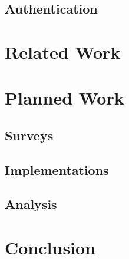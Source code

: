 \documentclass[defaultstyle,11pt]{thesis}
\begin{document}
\section{Authentication}

%
\chapter{Related Work}
\label{chap:related}

%
\chapter{Planned Work}
\label{chap:planned}

\section{Surveys}
\section{Implementations}
\section{Analysis}

%
\chapter{Conclusion}
\label{chap:conclusion}


\nocite{*}                %

\appendix
%
%
\end{document}
